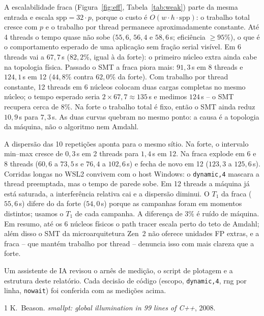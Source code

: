 \documentclass[10pt,a4paper]{article}
\begin{document}
\vspace{2pt}
A escalabilidade fraca (Figura~\ref{fig:eff}, Tabela~\ref{tab:weak}) parte da
mesma entrada e escala $\mathrm{spp}=32\cdot p$, porque o custo \'e
$O(w\cdot h\cdot\mathrm{spp})$: o trabalho total cresce com $p$ e o trabalho
por thread permanece aproximadamente constante. At\'e 4 threads o tempo quase
n\~ao sobe ($55{,}6$, $56{,}4$ e $58{,}6$\,s; efici\^encia $\ge 95\%$), o que
\'e o comportamento esperado de uma aplica\c{c}\~ao sem fra\c{c}\~ao serial
vis\'ivel. Em 6 threads vai a $67{,}7$\,s ($82{,}2\%$, igual \`a da forte): o
primeiro n\'ucleo extra ainda cabe na topologia f\'isica. Passado o SMT a fraca
piora mais: $91{,}3$\,s em 8 threads e $124{,}1$\,s em 12 ($44{,}8\%$ contra
$62{,}0\%$ da forte). Com trabalho por thread constante, 12 threads em 6
n\'ucleos colocam duas cargas completas no mesmo n\'ucleo; o tempo esperado
seria $2\times 67{,}7\approx 135$\,s e medimos $124$\,s -- o SMT recupera cerca
de $8\%$. Na forte o trabalho total \'e fixo, ent\~ao o SMT ainda reduz
$10{,}9$\,s para $7{,}3$\,s. As duas curvas quebram no mesmo ponto: a causa \'e
a topologia da m\'aquina, n\~ao o algoritmo nem Amdahl.

A dispers\~ao das 10 repeti\c{c}\~oes aponta para o mesmo s\'itio. Na forte, o
intervalo min--max cresce de $0{,}3$\,s em 2 threads para $1{,}4$\,s em 12. Na
fraca explode em 6 e 8 threads ($60{,}6$ a $73{,}5$\,s e $76{,}4$ a
$102{,}6$\,s) e fecha de novo em 12 ($123{,}3$ a $125{,}6$\,s). Corridas longas
no WSL2 convivem com o host Windows: o \texttt{dynamic,4} mascara a thread
preemptada, mas o tempo de parede sobe. Em 12 threads a m\'aquina j\'a est\'a
saturada, a interfer\^encia relativa cai e a dispers\~ao diminui. O $T_1$ da
fraca ($55{,}6$\,s) difere do da forte ($54{,}0$\,s) porque as campanhas foram
em momentos distintos; usamos o $T_1$ de cada campanha. A diferen\c{c}a de
$3\%$ \'e ru\'ido de m\'aquina. Em resumo, at\'e os 6 n\'ucleos f\'isicos o
path tracer escala perto do teto de Amdahl; al\'em disso o SMT da
microarquitetura Zen~2 n\~ao oferece unidades FP extras, e a fraca -- que
mant\'em trabalho por thread -- denuncia isso com mais clareza que a forte.

\vspace{1pt}
{\footnotesize Um assistente de IA revisou o arn\^es de medi\c{c}\~ao, o script
de plotagem e a estrutura deste relat\'orio. Cada decis\~ao de c\'odigo
(escopo, \texttt{dynamic,4}, rng por linha, \texttt{nowait}) foi conferida com
as medi\c{c}\~oes acima.}

\vspace{-6pt}
\begin{thebibliography}{1}
K.~Beason.
\newblock \emph{smallpt: global illumination in 99 lines of C++}, 2008.
\end{thebibliography}
\end{document}

